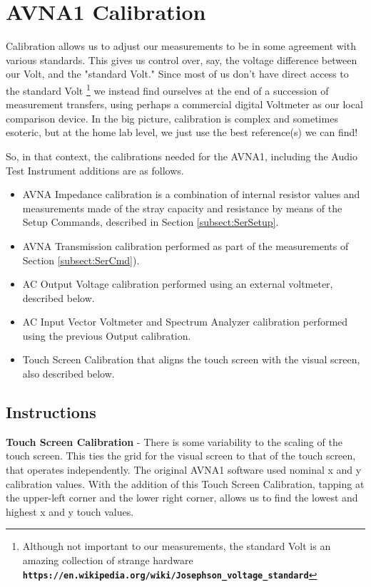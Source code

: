 \section{AVNA1 Calibration}
\label{sect:Cal}

Calibration allows us to adjust our measurements to be in some agreement with various standards.  This gives us control over, say, the voltage difference between our Volt, and the "standard Volt."  Since  most of us don't have direct access to the standard Volt
 \footnote{Although not important to our measurements, the standard Volt is an amazing collection of strange hardware
\textbf{  \texttt{https://en.wikipedia.org/wiki/Josephson\_voltage\_standard}  }
}
we instead find ourselves at the end of a succession of measurement transfers, using perhaps a commercial digital Voltmeter as our local comparison device.  In the big picture, calibration is complex and sometimes esoteric, but at the home lab level, we just use the best reference(s) we can find! 

So, in that context, the calibrations needed for the AVNA1, including the Audio Test Instrument additions are as follows.

\begin{itemize}
  \item AVNA Impedance calibration is a combination of internal resistor values and measurements made of the stray capacity and resistance by means of the Setup Commands, described in Section \ref{subsect:SerSetup}.
  \item AVNA Transmission calibration performed as part of the measurements of Section \ref{subsect:SerCmd}).
  \item AC Output Voltage calibration performed using an external voltmeter, described below.
  \item AC Input Vector Voltmeter and Spectrum Analyzer calibration performed using the previous Output calibration.
  \item Touch Screen Calibration that aligns the touch screen with the visual screen, also described below.
\end{itemize}

\subsection{Instructions}
\label{subsect:CalInstr}
\textbf{Touch Screen Calibration} - There is some variability to the scaling of the touch screen.  This ties the grid for the visual screen to that of the touch screen, that operates independently.  The original AVNA1 software used nominal x and y calibration values.  With the addition of this Touch Screen Calibration,   tapping at the upper-left corner and the lower right corner, allows us to find the lowest and highest x and y touch values.

